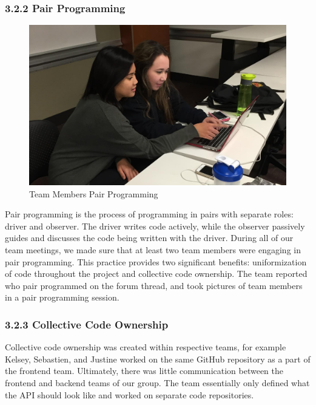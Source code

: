 \documentclass[]{article}
\begin{document}
\subsubsection{3.2.2 Pair Programming}\label{pair-programming}

\begin{figure}[htbp]
\centering
\includegraphics{serious_pair_prog.jpg}
\caption{Team Members Pair Programming}
\end{figure}

Pair programming is the process of programming in pairs with separate
roles: driver and observer. The driver writes code actively, while the
observer passively guides and discusses the code being written with the
driver. During all of our team meetings, we made sure that at least two
team members were engaging in pair programming. This practice provides
two significant benefits: uniformization of code throughout the project
and collective code ownership. The team reported who pair programmed on the forum thread, and took pictures of team members in a pair programming session.

\subsubsection{3.2.3 Collective Code
Ownership}\label{collective-code-ownership}

Collective code ownership was created within respective teams, for
example Kelsey, Sebastien, and Justine worked on the same GitHub
repository as a part of the frontend team. Ultimately, there was little
communication between the frontend and backend teams of our group. The
team essentially only defined what the API should look like and worked
on separate code repositories.
\end{document}
